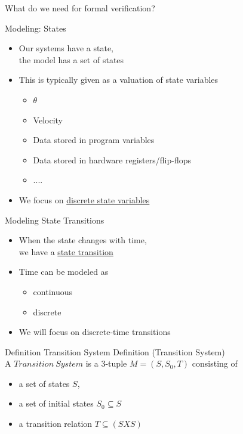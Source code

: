 \documentclass{beamer}
\begin{document}
\begin{frame}{What do we need for formal verification?}
\begin{frame}{Modeling: States}
\begin{itemize}
\item<1-> Our systems have a state, \\
the model has a set of states

\item<2-> This is typically given as a valuation of state variables
\begin{itemize}
\item $\theta$
\item Velocity
\item Data stored in program variables
\item Data stored in hardware registers/flip-flops
\item ....
\end{itemize}

\item<3-> We focus on \underline{discrete state variables}
\end{itemize}
\end{frame}

\begin{frame}{Modeling State Transitions}
\begin{itemize}
\item<1-> When the state changes with time, \\
we have a \underline{state transition}

\item<2-> Time can be modeled as
 \begin{itemize}
\item continuous
\item discrete
\end{itemize}

\item<3-> We will focus on discrete-time transitions
\end{itemize}
\end{frame}

\begin{frame}{Definition Transition System}
Definition (Transition System) \\
A $Transition~System$ is a 3-tuple $M = (S, S_0, T)$ consisting of
\begin{itemize}
\item a set of states $S$,

\item a set of initial states $S_0 \subseteq S$\item a transition relation $T \subseteq (S X S)$
\end{itemize}
\end{frame}


\end{frame}
\end{document}
